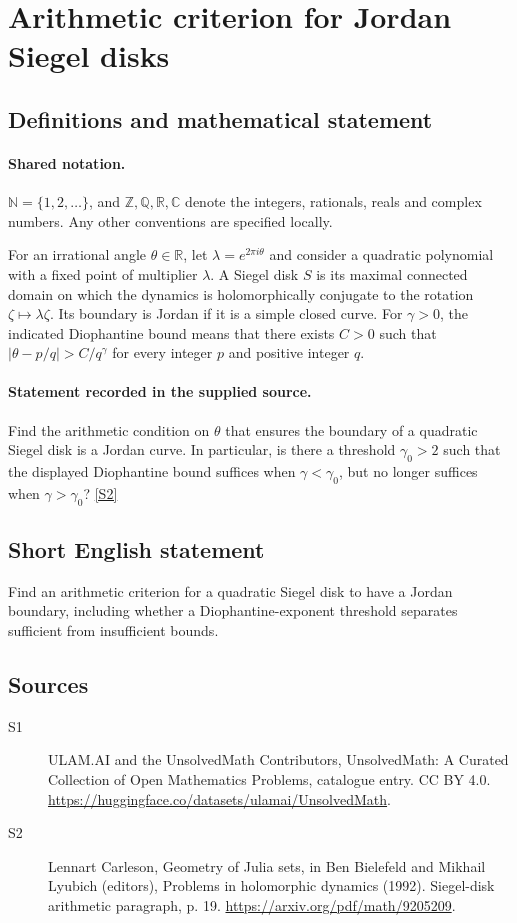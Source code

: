 \documentclass[11pt]{article}
\newcommand{\sref}[2]{\hyperlink{source:#1:#2}{[S#2]}}
\begin{document}
\section{Arithmetic criterion for Jordan Siegel disks}\label{statement}

\subsection{Definitions and mathematical statement}

\paragraph{Shared notation.}$\mathbb N=\{1,2,\ldots\}$, and $\mathbb Z,\mathbb Q,\mathbb R,\mathbb C$ denote the integers, rationals, reals and complex numbers. Any other conventions are specified locally.


For an irrational angle $\theta\in\mathbb R$, let $\lambda=e^{2\pi i\theta}$ and consider a quadratic polynomial with a fixed point of multiplier $\lambda$. A Siegel disk $S$ is its maximal connected domain on which the dynamics is holomorphically conjugate to the rotation $\zeta\mapsto\lambda\zeta$. Its boundary is Jordan if it is a simple closed curve. For $\gamma>0$, the indicated Diophantine bound means that there exists $C>0$ such that $|\theta-p/q|>C/q^\gamma$ for every integer $p$ and positive integer $q$.
\paragraph{Statement recorded in the supplied source.}
Find the arithmetic condition on $\theta$ that ensures the boundary of a quadratic Siegel disk is a Jordan curve. In particular, is there a threshold $\gamma_0>2$ such that the displayed Diophantine bound suffices when $\gamma<\gamma_0$, but no longer suffices when $\gamma>\gamma_0$? \sref{statement}{2}
\subsection{Short English statement}
Find an arithmetic criterion for a quadratic Siegel disk to have a Jordan boundary, including whether a Diophantine-exponent threshold separates sufficient from insufficient bounds.
\subsection{Sources}
\begin{description}
\item[\hypertarget{source:statement:1}{S1}] ULAM.AI and the UnsolvedMath Contributors, UnsolvedMath: A Curated Collection of Open Mathematics Problems, catalogue entry. CC BY 4.0. \url{https://huggingface.co/datasets/ulamai/UnsolvedMath}.
\item[\hypertarget{source:statement:2}{S2}] Lennart Carleson, Geometry of Julia sets, in Ben Bielefeld and Mikhail Lyubich (editors), Problems in holomorphic dynamics (1992). Siegel-disk arithmetic paragraph, p. 19. \url{https://arxiv.org/pdf/math/9205209}.
\end{description}
\label{end:statement}
\end{document}
